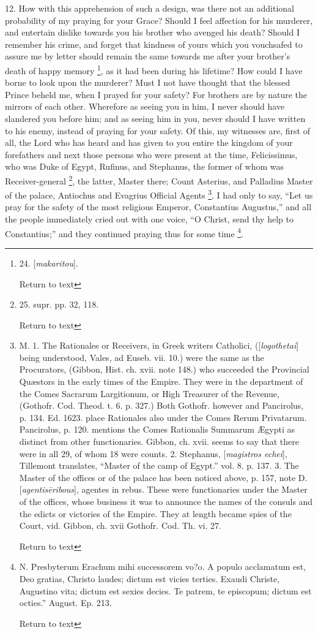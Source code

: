 12. How with this apprehension of such a design, was there not an
additional probability of my praying for your Grace? Should I feel
affection for his murderer, and entertain dislike towards you his
brother who avenged his death? Should I remember his crime, and forget
that kindness of yours which you vouchsafed to assure me by letter
should remain the same towards me after your brother's death of happy
memory \footnote{24. [\emph{makaritou}].

Return to text}, as it had
been during his lifetime? How could I have borne to look upon the
murderer? Must I not have thought that the blessed Prince beheld
me, when I prayed for your safety? For brothers are by nature the
mirrors of each other. Wherefore as seeing you in him, I never should
have slandered you before him; and as seeing him in you, never should
I have written to his enemy, instead of praying for your safety. Of
this, my witnesses are, first of all, the Lord who has heard and has
given to you entire the kingdom of your forefathers and next those
persons who were present at the time, Felicissimus, who was Duke of
Egypt, Rufinus, and Stephanus, the former of whom was Receiver-general
\footnote{25. supr. pp. 32, 118.

Return to text}, the latter, Master
there; Count Asterius, and Palladius Master of the palace, Antiochus
and Evagrius Official Agents \footnote{M. 1. The Rationales or Receivers, in Greek writers Catholici, ([\emph{logothetai}]
being understood, Vales, ad Euseb. vii. 10.) were the same as the
Procurators, (Gibbon, Hist. ch. xvii. note 148.) who succeeded the
Provincial Quæstors in the early times of the Empire. They were in
the department of the Comes Sacrarum Largitionum, or High Treasurer of
the Revenue, (Gothofr. Cod. Theod. t. 6. p. 327.) Both Gothofr.
however and Pancirolus, p. 134. Ed. 1623. place Rationales also under
the Comes Rerum Privatarum. Pancirolus, p. 120. mentions the Comes
Rationalis Summarum Ægypti as distinct from other functionaries.
Gibbon, ch. xvii. seems to say that there were in all 29, of whom 18
were counts. 2. Stephanus, [\emph{magistros
echei}],
Tillemont translates, ``Master of the camp of Egypt.'' vol. 8. p. 137.
3. The Master of the offices or of the palace has been noticed above,
p. 157, note D. [\emph{agentis\={e}ribous}],
agentes in rebus. These were functionaries under the Master of the
offices, whose business it was to announce the names of the consuls
and the edicts or victories of the Empire. They at length became spies
of the Court, vid. Gibbon, ch. xvii Gothofr. Cod. Th. vi. 27.

Return to text}.
I had only to say, ``Let us pray for the safety of the most religious
Emperor, Constantius Augustus,'' and all the people immediately cried
out with one voice, ``O Christ, send thy help to Constantius;'' and they
continued praying thus for some time \footnote{N. Presbyterum Erachum mihi successorem vo?o. A populo acclamatum est,
Deo gratias, Christo laudes; dictum est vicies terties. Exaudi Christe,
Augustino vita; dictum est sexies decies. Te patrem, te episcopum;
dictum est octies.'' August. Ep. 213.

Return to text}.

